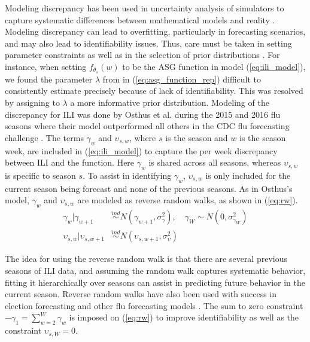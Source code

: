 Modeling discrepancy has been used in uncertainty analysis of 
simulators to capture systematic differences between mathematical models and 
reality \cite[]{ma2022multifidelity,brynjarsdottir2014learning,
arendt2012improving,kennedy2001bayesian}. Modeling discrepancy can lead to 
overfitting, particularly in forecasting scenarios, and may also lead to 
identifiability issues. 
Thus, care must be taken in setting parameter constraints as well as in the 
selection of prior distributions \cite[]{osthus2019dynamic,
brynjarsdottir2014learning}. 
For instance, when setting $f_{\theta_s}(w)$ to
be the ASG function
in model (\ref{eq:ili_model}), we found the parameter $\lambda$ from 
in (\ref{eq:asg_function_rep}) difficult to consistently 
estimate precisely because of lack of identifiability. This was resolved by 
assigning to $\lambda$ a more informative prior distribution.
Modeling of the discrepancy for ILI was done by Osthus et al. during the 2015 
and 2016 flu seasons where their model outperformed all others in the CDC flu 
forecasting challenge \cite[]{osthus2019dynamic}.
The terms $\gamma_w$ and $\upsilon_{s,w}$, where $s$ is the season and $w$ is the 
season week, are included in 
(\ref{eq:ili_model}) to capture the per week discrepancy between ILI and the 
function. Here $\gamma_w$ is shared across all seasons, whereas $\upsilon_{s,w}$
is specific to season $s$. To assist in identifying $\gamma_w$,
$\upsilon_{s,w}$ is only included for the current season being forecast and 
none of the previous seasons.
 As in Osthus's model, 
$\gamma_w$ and $\upsilon_{s,w}$ are modeled as reverse random walks, as shown 
in (\ref{eq:rw}). 
\begin{equation}
    \begin{aligned}
    \label{eq:rw}
        \gamma_w|\gamma_{w + 1} &\overset{ind}{\sim} N(\gamma_{w+1},\sigma^2_{\gamma}), \quad
        \gamma_{W} \sim N(0,\sigma^2_{\gamma_W}) \\
        \upsilon_{s,w}|\upsilon_{s, w + 1} &\overset{ind}{\sim} N(\upsilon_{s, w+1},\sigma^2_{\upsilon})
    \end{aligned}
\end{equation}


The idea for using the reverse random walk is that there are several previous 
seasons of ILI data, and assuming the random walk captures systematic behavior, 
fitting it hierarchically over seasons can assist in predicting future behavior 
in the current season. 
Reverse random walks have also been used with success in election forecasting 
and other flu forecasting models \cite[]{osthus2021multiscale, 
osthus2019dynamic, linzer2013dynamic}. The sum to zero constraint 
$-\gamma_1 = \sum_{w=2}^W \gamma_w$ is imposed on (\ref{eq:rw}) to improve 
identifiability as well as the constraint $\upsilon_{s, W} = 0$.










